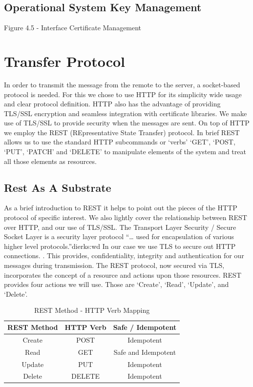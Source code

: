 \subsection{Operational System Key Management}
     
     Figure 4.5 - Interface Certificate Management

\section{Transfer Protocol}
     In order to transmit the message from the remote to the server, a socket-based protocol is needed. For this we chose to use HTTP for its simplicity wide usage and clear protocol definition.
\cite{Moore:we}   
HTTP also has the advantage of providing TLS/SSL encryption and seamless integration with certificate libraries. We make use of TLS/SSL to provide security when the messages are sent. 
On top of HTTP we employ the REST (REpresentative State Transfer) protocol.\cite{Fielding:2000dd}  In brief REST allows us to use the standard HTTP subcommands or ‘verbs’ ‘GET’, ‘POST, ‘PUT’, ‘PATCH’ and ‘DELETE’ to manipulate elements of the system and treat all those elements as resources. 
\subsection{Rest As A Substrate}
As a brief introduction to REST it helps to point out the pieces of the HTTP protocol of specific interest. We also lightly cover the relationship between REST over HTTP, and our use of TLS/SSL.   
The Transport Layer Security / Secure Socket Layer is a security layer protocol “… used for encapsulation of various higher level protocols.”{dierks:wd}  In our case  we use TLS to secure out HTTP connections. \cite{Rescorla:2000tv}.
  This provides, confidentiality, integrity and authentication for our messages during transmission. 
     The REST protocol, now secured via TLS, incorporates the concept of a resource and actions upon those resources. REST provides four actions we will use.  Those are ‘Create’, ‘Read’, ‘Update’, and ‘Delete’.  

\begin{table}[ ]
\centering
\begin{tabular}{c|c|c}
 \bf REST Method & \bf HTTP Verb & \bf Safe / Idempotent \\
 \hline
      Create &  POST   &  Idempotent          \\
      Read   &  GET    &  Safe and Idempotent \\
      Update &  PUT    &  Idempotent          \\
      Delete &  DELETE &  Idempotent          \\
 \hline
\end{tabular}
\caption{REST Method - HTTP Verb Mapping}
\label{tab:restMapping}
\end{table}

